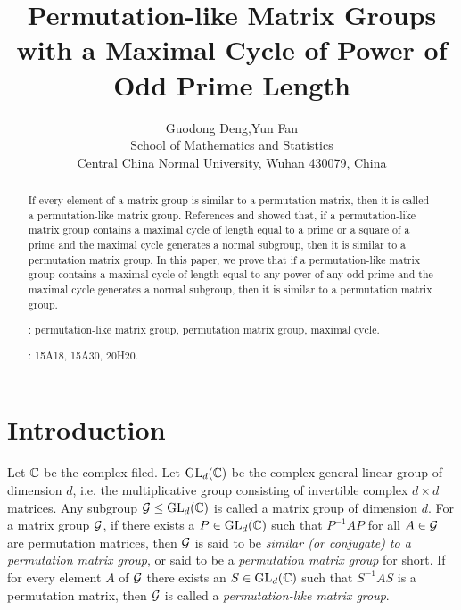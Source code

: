 \documentclass{article}
\numberwithin{equation}{section}
\begin{document}
\title{Permutation-like Matrix Groups with a Maximal Cycle of Power of
Odd Prime Length }
\author{Guodong Deng,\quad Yun Fan\\
\small School of Mathematics and Statistics\\
\small Central China Normal University, Wuhan 430079, China}
\date{}
\maketitle

\insert{}

\begin{abstract}
If every element of a matrix group is similar to a permutation matrix,
then it is called a permutation-like matrix group. References \cite{C07}
and \cite{DF} showed that, if a permutation-like matrix group
contains a maximal cycle of length equal to a prime or a square of a prime
and the maximal cycle generates a normal subgroup,
then it is similar to a permutation matrix group.
In this paper, we prove that if a permutation-like matrix group
contains a maximal cycle of length equal to any power of any odd prime
and the maximal cycle generates a normal subgroup,
then it is similar to a permutation matrix group.

:
permutation-like matrix group, permutation matrix group, maximal cycle.

: 15A18, 15A30, 20H20.
\end{abstract}

\section{Introduction}

Let ${\Bbb C}$ be the complex filed. Let
${\rm GL}_d({\Bbb C})$ be the complex general linear group
of dimension $d$, i.e. the multiplicative group consisting of
invertible complex $d\times d$ matrices.
Any subgroup ${\cal G}\le{\rm GL}_d({\Bbb C})$ is called a matrix group of
dimension $d$. For a matrix group ${\cal G}$, if there exists a
$P\in{\rm GL}_d({\Bbb C})$ such that $P^{-1}AP$ for all $A\in{\cal G}$
are permutation matrices, then ${\cal G}$ is said to be
{\em similar (or conjugate) to a permutation matrix group},
or said to be a {\em permutation matrix group} for short.
If for every element $A$ of ${\cal G}$ there exists an
$S\in{\rm GL}_d({\Bbb C})$ such that $S^{-1}AS$ is a permutation matrix, 
then ${\cal G}$ is called a {\em permutation-like matrix group}.
\end{document}
